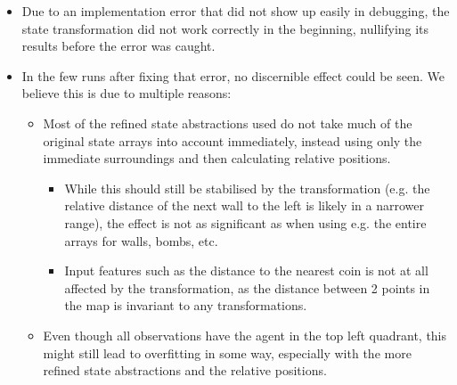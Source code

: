 \documentclass{article} %
\begin{document}
	\begin{itemize}
		\item Due to an implementation error that did not show up easily in debugging, the state transformation did not work correctly in the beginning, nullifying its results before the error was caught.
		\item In the few runs after fixing that error, no discernible effect could be seen. We believe this is due to multiple reasons:
		\begin{itemize}
			\item Most of the refined state abstractions used do not take much of the original state arrays into account immediately, instead using only the immediate surroundings and then calculating relative positions.
			\begin{itemize}
				\item While this should still be stabilised by the transformation (e.g. the relative distance of the next wall to the left is likely in a narrower range), the effect is not as significant as when using e.g. the entire arrays for walls, bombs, etc.
				\item Input features such as the distance to the nearest coin is not at all affected by the transformation, as the distance between 2 points in the map is invariant to any transformations.
			\end{itemize}
			\item Even though all observations have the agent in the top left quadrant, this might still lead to overfitting in some way, especially with the more refined state abstractions and the relative positions.
		\end{itemize}
	\end{itemize}
	
	
	
\end{document}

